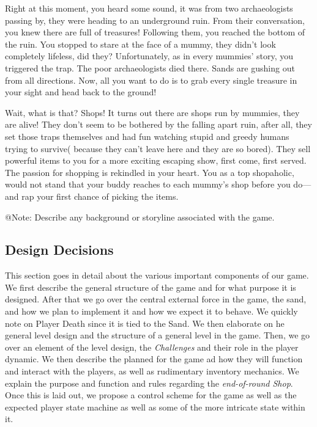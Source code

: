 Right at this moment, you heard some sound, it was from two archaeologists passing by, they were heading to an underground ruin. From their conversation, you knew there are full of treasures! Following them, you reached the bottom of the ruin. You stopped to stare at the face of a mummy, they didn't look completely lifeless, did they? Unfortunately, as in every mummies' story, you triggered the trap. The poor archaeologists died there. Sands are gushing out from all directions. Now, all you want to do is to grab every single treasure in your sight and head back to the ground!

Wait, what is that? Shops! It turns out there are shops run by mummies, they are alive! They don't seem to be bothered by the falling apart ruin, after all, they set those traps themselves and had fun watching stupid and greedy humans trying to survive( because they can't leave here and they are so bored). They sell powerful items to you for a more exciting escaping show, first come, first served. The passion for shopping is rekindled in your heart. You as a top shopaholic, would not stand that your buddy reaches to each mummy’s shop before you do— and rap your first chance of picking the items.




\begin{TempText}
    
    
    
	@Note: Describe any background or storyline associated with the game.
\end{TempText}

\subsection{Design Decisions}

This section goes in detail about the various important components of our game. We first describe the general structure of the game and for what purpose it is designed. After that we go over the central external force in the game, the sand, and how we plan to implement it and how we expect it to behave. We quickly note on Player Death since it is tied to the Sand. We then elaborate on he general level design and the structure of a general level in the game. Then, we go over an element of the level design, the \emph{Challenges} and their role in the player dynamic. We then describe the planned  for the game ad how they will function and interact with the players, as well as rudimentary inventory mechanics. We explain the purpose and function and rules regarding the \emph{end-of-round Shop}. Once this is laid out, we propose a control scheme for the game as well as the expected player state machine as well as some of the more intricate state within it.

